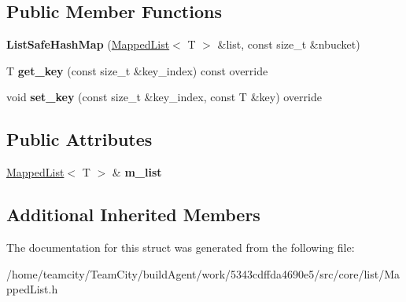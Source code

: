 \subsection*{Public Member Functions}
\begin{DoxyCompactItemize}
\item 
{\bfseries List\+Safe\+Hash\+Map} (\hyperlink{classMappedList}{Mapped\+List}$<$ T $>$ \&list, const size\+\_\+t \&nbucket)\hypertarget{structListSafeHashMap_a376267a60ed220c7bb61eeb155e8f2d9}{}\label{structListSafeHashMap_a376267a60ed220c7bb61eeb155e8f2d9}

\item 
T {\bfseries get\+\_\+key} (const size\+\_\+t \&key\+\_\+index) const override\hypertarget{structListSafeHashMap_a9165598b25b0120b9ae2be1cb07f81e6}{}\label{structListSafeHashMap_a9165598b25b0120b9ae2be1cb07f81e6}

\item 
void {\bfseries set\+\_\+key} (const size\+\_\+t \&key\+\_\+index, const T \&key) override\hypertarget{structListSafeHashMap_aa3a1d83c5b5de2179969e41eef9ac394}{}\label{structListSafeHashMap_aa3a1d83c5b5de2179969e41eef9ac394}

\end{DoxyCompactItemize}
\subsection*{Public Attributes}
\begin{DoxyCompactItemize}
\item 
\hyperlink{classMappedList}{Mapped\+List}$<$ T $>$ \& {\bfseries m\+\_\+list}\hypertarget{structListSafeHashMap_a5e4a429dca682b116079636a407f0284}{}\label{structListSafeHashMap_a5e4a429dca682b116079636a407f0284}

\end{DoxyCompactItemize}
\subsection*{Additional Inherited Members}


The documentation for this struct was generated from the following file\+:\begin{DoxyCompactItemize}
\item 
/home/teamcity/\+Team\+City/build\+Agent/work/5343cdffda4690e5/src/core/list/Mapped\+List.\+h\end{DoxyCompactItemize}
